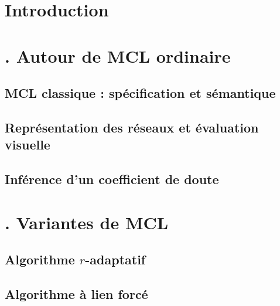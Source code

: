\documentclass[12pt,a4paper]{report}
\begin{document}
\tableofcontents

\newpage

\chapter*{Introduction}

\chapter*{\thechapter . Autour de MCL ordinaire}

\section{MCL classique : spécification et sémantique}


\section{Représentation des réseaux et évaluation visuelle}


\section{Inférence d'un coefficient de doute}


\chapter*{\thechapter . Variantes de MCL}

\section{Algorithme $r$-adaptatif}

\section{Algorithme à lien forcé}
\end{document}

